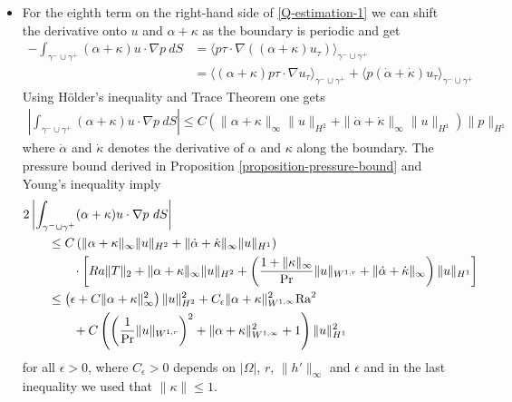\documentclass{article}
\theoremstyle{definition}
\theoremstyle{definition}
\newcommand{\Pra}{\rm{Pr}}
\newcommand{\Ra}{{\rm{Ra}}}
\begin{document}
\begin{itemize}
    \item
    For the eighth term on the right-hand side of \eqref{Q-estimation-1} we can shift the derivative onto $u$ and $\alpha+\kappa$ as the boundary is periodic and get
    \begin{align*}
        -\int_{\gamma^-\cup\gamma^+} (\alpha+\kappa)u\cdot \nabla p \ dS &= \langle p \tau \cdot \nabla ((\alpha+\kappa) u_\tau)\rangle_{\gamma^-\cup\gamma^+} 
        \\
        &= \langle (\alpha+\kappa) p \tau \cdot \nabla u_\tau\rangle_{\gamma^-\cup\gamma^+} + \langle p (\dot\alpha+\dot\kappa) u_\tau\rangle_{\gamma^-\cup\gamma^+} 
    \end{align*}
    Using Hölder's inequality and Trace Theorem one gets
    \begin{align*}
        \left|\int_{\gamma^-\cup\gamma^+} (\alpha+\kappa)u\cdot \nabla p \ dS\right| \leq C \left( \|\alpha+\kappa\|_\infty \|u\|_{H^2} + \|\dot\alpha+\dot\kappa\|_\infty\|u\|_{H^1} \right)\|p\|_{H^1}
    \end{align*}
    where $\dot \alpha$ and $\dot \kappa$ denotes the derivative of $\alpha$ and $\kappa$ along the boundary. The pressure bound derived in Proposition \ref{proposition-pressure-bound} and Young's inequality imply
    \begin{equation}
        \label{Q-estimation-up}
        \begin{aligned}
            &2\left|\int_{\gamma^-\cup\gamma^+} (\alpha+\kappa)u\cdot \nabla p  \ dS\right|
            \\
            &\qquad \leq C \left( \|\alpha+\kappa\|_\infty \|u\|_{H^2} + \|\dot\alpha+\dot\kappa\|_\infty\|u\|_{H^1} \right)
            \\
            &\qquad\qquad\cdot\left[Ra\|T\|_2 + \|\alpha+\kappa\|_\infty\|u\|_{H^2}+\left(\frac{1+\|\kappa\|_\infty}{\Pra}\|u\|_{W^{1,r}}+\|\dot\alpha+\dot\kappa\|_\infty \right)\|u\|_{H^1}\right]
            \\
            &\qquad \leq \left(\epsilon+C\|\alpha+\kappa\|_\infty^2\right) \|u\|_{H^2}^2 + C_\epsilon \|\alpha+\kappa\|_{W^{1,\infty}}^2 \Ra^2  
            \\
            &\qquad\qquad + C\left( \left(\frac{1}{\Pra}\|u\|_{W^{1,r}}\right)^2+\|\alpha+\kappa\|_{W^{1,\infty}}^2+1 \right)\|u\|_{H^1}^2
        \end{aligned}
    \end{equation}
    for all $\epsilon>0$, where $C_\epsilon>0$ depends on $|\Omega|$, $r$, $\|h'\|_{\infty}$ and $\epsilon$ and in the last inequality we used that $\|\kappa\|\leq 1$.

\end{itemize}
\end{document}
